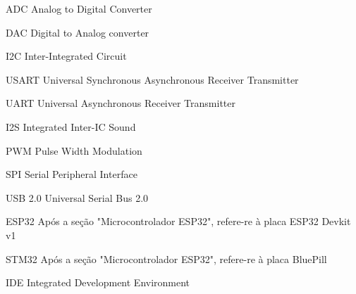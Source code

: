 







\frenchspacing 


	\imprimircapa

	\imprimirfolhaderosto*

	\listoffigures*
	\cleardoublepage

	\listofquadros*
	\cleardoublepage


	\begin{siglas}
		\item[ADC] Analog to Digital Converter
		\item[DAC] Digital to Analog converter
		\item[I2C] Inter-Integrated Circuit
		\item[USART] Universal Synchronous Asynchronous Receiver Transmitter
		\item[UART] Universal Asynchronous Receiver Transmitter
		\item[I2S] Integrated Inter-IC Sound
		\item[PWM] Pulse Width Modulation
		\item[SPI] Serial Peripheral Interface
		\item[USB 2.0] Universal Serial Bus 2.0
		\item[ESP32] Após a seção "Microcontrolador ESP32", refere-re à placa ESP32 Devkit v1
		\item[STM32] Após a seção "Microcontrolador ESP32", refere-re à placa BluePill
		\item[IDE] Integrated Development Environment
	\end{siglas}

	\tableofcontents*
	\cleardoublepage


\textual

	

